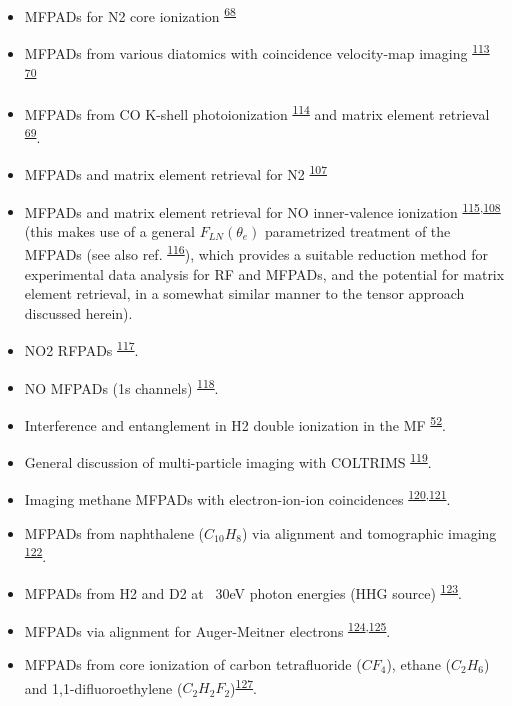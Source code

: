 \documentclass[10pt]{article}
\begin{document}
\begin{itemize}
\item MFPADs for N2 core ionization \textsuperscript{\hyperref[csl:68]{68}}
\item MFPADs from various diatomics with coincidence velocity-map imaging \textsuperscript{\hyperref[csl:113]{113}} \textsuperscript{\hyperref[csl:70]{70}}
\item MFPADs from CO K-shell photoionization \textsuperscript{\hyperref[csl:114]{114}} and matrix element retrieval \textsuperscript{\hyperref[csl:69]{69}}.
\item MFPADs and matrix element retrieval for N2 \textsuperscript{\hyperref[csl:107]{107}}
\item MFPADs and matrix element retrieval for NO inner-valence ionization \textsuperscript{\hyperref[csl:115]{115},\hyperref[csl:108]{108}} (this makes use of a general $F_{LN}(\theta_e)$ parametrized treatment of the MFPADs (see also ref. \textsuperscript{\hyperref[csl:116]{116}}), which provides a suitable reduction method for experimental data analysis for RF and MFPADs, and the potential for matrix element retrieval, in a somewhat similar manner to the tensor approach discussed herein). %
\item NO2 RFPADs \textsuperscript{\hyperref[csl:117]{117}}.
\item NO MFPADs (1s channels) \textsuperscript{\hyperref[csl:118]{118}}.
\item Interference and entanglement in H2 double ionization in the MF \textsuperscript{\hyperref[csl:52]{52}}.
\item General discussion of multi-particle imaging with COLTRIMS \textsuperscript{\hyperref[csl:119]{119}}.
\item Imaging methane MFPADs with electron-ion-ion coincidences \textsuperscript{\hyperref[csl:120]{120},\hyperref[csl:121]{121}}.
\item MFPADs from naphthalene ($C_{10}H_{8}$) via alignment and tomographic imaging \textsuperscript{\hyperref[csl:122]{122}}.
\item MFPADs from H2 and D2 at ~30eV photon energies (HHG source) \textsuperscript{\hyperref[csl:123]{123}}.
\item MFPADs via alignment for Auger-Meitner electrons \textsuperscript{\hyperref[csl:124]{124},\hyperref[csl:125]{125}}.
\item MFPADs from core ionization of carbon tetrafluoride ($CF_4$), ethane ($C_2H_6$) and 1,1-difluoroethylene ($C_2 H_2 F_2$)\textsuperscript{\hyperref[csl:127]{127}}.
\end{itemize}
\end{document}

